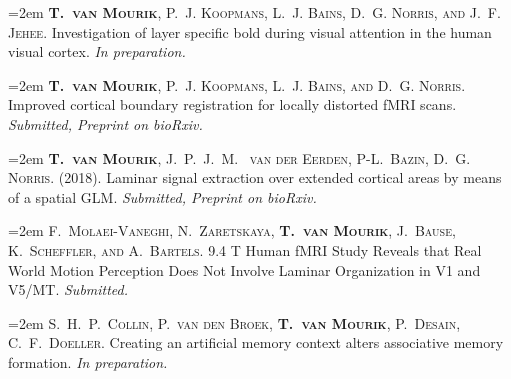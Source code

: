 \hangindent=2em
\noindent
\textsc{\textbf{T.~van Mourik}, P.~J. Koopmans, L.~J. Bains, D.~G. Norris, and J.~F. Jehee.} 
Investigation of layer specific bold during visual attention in the human visual cortex.
\emph{In preparation.}


\hangindent=2em
\noindent
\textsc{\textbf{T.~van Mourik}, P.~J. Koopmans, L.~J. Bains, and D.~G. Norris.} 
Improved cortical boundary registration for locally distorted fMRI scans.
\emph{Submitted, Preprint on bioRxiv.}


\hangindent=2em
\noindent
\textsc{\textbf{T.~van Mourik}, J.~P.~J.~M.~ van der Eerden, P-L.~Bazin, D.~G. Norris.} 
(2018).
Laminar signal extraction over extended cortical areas by means of a spatial GLM.
\emph{Submitted, Preprint on bioRxiv.}


\hangindent=2em
\noindent
\textsc{F.~Molaei-Vaneghi, N.~Zaretskaya, \textbf{T.~van Mourik}, J.~Bause, K.~Scheffler, and A.~Bartels.} 
9.4 T Human fMRI Study Reveals that Real World Motion Perception Does Not Involve Laminar Organization in V1 and V5/MT.
\emph{Submitted.}


\hangindent=2em
\noindent
\textsc{S.~H.~P.~Collin, P.~van den Broek, \textbf{T.~van Mourik}, P.~Desain, C.~F.~Doeller.}
Creating an artificial memory context alters associative memory formation.
\emph{In preparation.}
